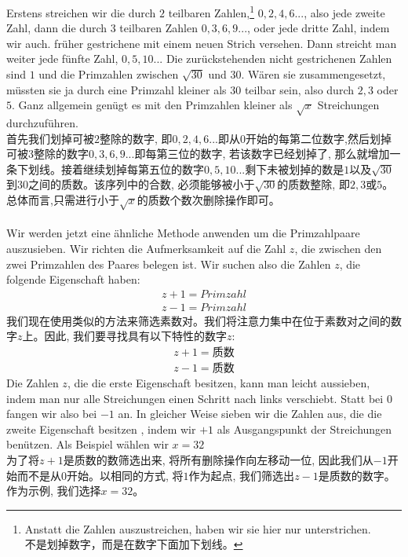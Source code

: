 \documentclass[UTF8,a4paper,zihao=-4]{article}
\begin{document}
\indent Erstens streichen wir die durch $2$ teilbaren Zahlen,\footnote[1]{Anstatt die Zahlen auszustreichen, haben wir sie hier nur unterstrichen.\\\indent 不是划掉数字，而是在数字下面加下划线。} $0,2,4,6...$, also jede zweite Zahl, dann die durch $3$ teilbaren Zahlen $0,3,6,9...$, oder jede dritte Zahl, indem wir auch. früher gestrichene mit einem neuen Strich versehen. Dann streicht man weiter jede fünfte Zahl, $0,5,10...$ Die zurückstehenden nicht gestrichenen Zahlen sind $1$ und die Primzahlen zwischen $\sqrt{30}$ und $30$. Wären sie zusammengesetzt, müssten sie ja durch eine Primzahl kleiner als $30$ teilbar sein, also durch $2,3$ oder $5$. Ganz allgemein genügt es mit den Primzahlen kleiner als $\sqrt{x}$ Streichungen durchzuführen.\\
\indent 首先我们划掉可被$2$整除的数字, 即$0,2,4,6...$即从$0$开始的每第二位数字,然后划掉可被$3$整除的数字$0,3,6,9...$即每第三位的数字, 若该数字已经划掉了, 那么就增加一条下划线。接着继续划掉每第五位的数字$0,5,10...$剩下未被划掉的数是$1$以及$\sqrt{30}$到$30$之间的质数。该序列中的合数, 必须能够被小于$\sqrt{30}$的质数整除, 即$2,3或5$。总体而言,只需进行小于$\sqrt{x}$的质数个数次删除操作即可。\\\\
\indent Wir werden jetzt eine ähnliche Methode anwenden um die Primzahlpaare auszusieben. Wir richten die Aufmerksamkeit auf die Zahl $z$, die zwischen den zwei Primzahlen des Paares belegen ist. Wir suchen also die Zahlen $z$, die folgende Eigenschaft haben:
\begin{align*}
    z+1=Primzahl\\
    z-1=Primzahl
    \end{align*}
\indent 我们现在使用类似的方法来筛选素数对。我们将注意力集中在位于素数对之间的数字$z$上。因此, 我们要寻找具有以下特性的数字$z$:
\begin{align*}
    z+1=质数\\
    z-1=质数
\end{align*}
\indent Die Zahlen $z$, die die erste Eigenschaft besitzen, kann man leicht aussieben, indem man nur alle Streichungen einen Schritt nach links verschiebt. Statt bei 0 fangen wir also bei $-1$ an. In gleicher Weise sieben wir die Zahlen aus, die die zweite Eigenschaft besitzen , indem wir $+1$ als Ausgangspunkt der Streichungen benützen. Als Beispiel wählen wir $x=32$\\
\indent 为了将$z+1$是质数的数筛选出来, 将所有删除操作向左移动一位, 因此我们从$-1$开始而不是从$0$开始。以相同的方式, 将$1$作为起点, 我们筛选出$z-1$是质数的数字。作为示例, 我们选择$x=32$。
\end{document}
